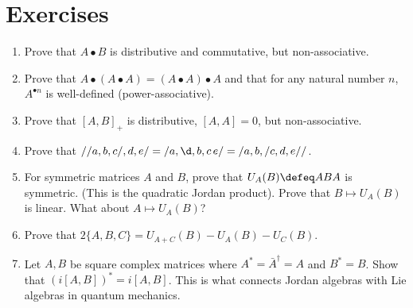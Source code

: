 \section*{Exercises}
\begin{enumerate}
\item Prove that $A\bullet B$ is distributive and commutative, but non-associative.
\item Prove that $A\bullet (A\bullet A)=(A\bullet A)\bullet A$ and that 
for any natural number $n$, $A^{\bullet n}$ is well-defined (power-associative).

\item Prove that $[A,B]_+$ is distributive, $[A,A]=0$, but non-associative.

\item Prove that $//a,b,c/,d,e/=/a,\d,b,c\,e/=/a,b,/c,d,e//$.

\item For symmetric matrices $A$ and $B$, prove that $U_A(B)\defeq ABA$ is symmetric.
(This is the quadratic Jordan product).  Prove that $B\mapsto U_A(B)$ is linear.  What 
about $A\mapsto U_A(B)$?

\item Prove that $2\{A,B,C\}=U_{A+C}(B)-U_A(B)-U_C(B)$.

\item Let $A,B$ be square complex matrices where $A^*=\bar{A}^{\dagger}=A$ and 
$B^*=B$.  Show that $(i[A,B])^*=i[A,B]$.  This is what connects Jordan algebras 
with Lie algebras in quantum mechanics.
\end{enumerate}